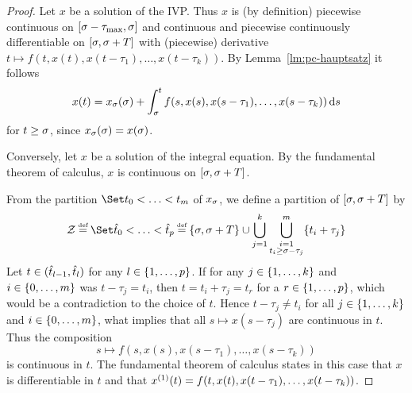     \begin{proof}
        Let $x$ be a solution of the IVP. Thus $x$ is (by definition) piecewise continuous on $\compactum{\tzero-\taumax}{\tzero}$ and continuous and piecewise continuously differentiable on $\compactum{\tzero}{\tzero+T}$ with (piecewise) derivative $t\mapsto f(t,x(t),x(t-\tau_1),\ldots,x(t-\tau_k))$.
        By Lemma~\ref{lm:pc-hauptsatz} it follows
        \begin{equation*}
            x(t) = x_{\tzero}(\tzero) + \integral{\tzero}{t} f(s,x(s),x(s-\tau_1),\ldots,x(s-\tau_k))\dx[s]
        \end{equation*}
        for $t\geq\tzero$, since $x_{\tzero}(\tzero)=x(\tzero)$.

        Conversely, let $x$ be a solution of the integral equation.
        By the fundamental theorem of calculus, $x$ is continuous on $\compactum{\tzero}{\tzero+T}$.

        From the partition $\partition{t_0}{t_m}$ of $x_{\tzero}$, we define a partition of $\compactum{\tzero}{\tzero+T}$ by
        \begin{equation}\label{eq:partition}
            \mathcal{Z}\defeq \partition{\hat{t}_0}{\hat{t}_p}
            \defeq \set{\tzero,\tzero+T}\cup\bigcup_{j=1}^{k}\bigcup_{\substack{i=1\\t_i\geq\tzero-\tau_j}}^{m}\set{t_i+\tau_j}
        \end{equation}
        Let $t\in\open{\hat{t}_{l-1}}{\hat{t}_l}$ for any $l\in\set{\range{1}{p}}$. If for any $j\in\set{\range{1}{k}}$ and $i\in\set{\range{0}{m}}$ was $t-\tau_j = t_i$, then $t=t_i+\tau_j=\hat{t}_r$ for a $r\in\set{\range{1}{p}}$, which would be a contradiction to the choice of $t$. Hence $t-\tau_j \neq t_i$ for all $j\in\set{\range{1}{k}}$ and $i\in\set{\range{0}{m}}$, what implies that all $s\mapsto x(s-\tau_j)$ are continuous in $t$. Thus the composition
        \begin{equation*}
            s\mapsto f(s,x(s),x(s-\tau_1),\ldots,x(s-\tau_k))
        \end{equation*}
        is continuous in $t$. The fundamental theorem of calculus states in this case that $x$ is differentiable in $t$ and that $\D{x}(t)=f(t,x(t),x(t-\tau_1),\ldots,x(t-\tau_k))$.


\end{proof}
